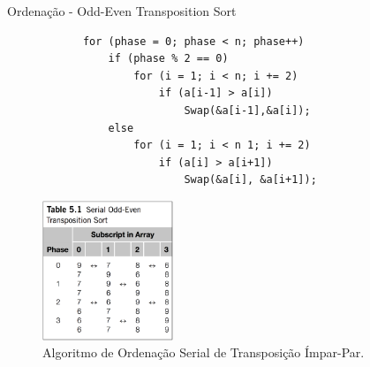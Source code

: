	\begin{frame}[fragile]{Ordenação - Odd-Even Transposition Sort }
		\begin{multicols}{2}
			\begin{verbatim}
			for (phase = 0; phase < n; phase++) 
				if (phase % 2 == 0)
					for (i = 1; i < n; i += 2)
						if (a[i-1] > a[i]) 
							Swap(&a[i-1],&a[i]); 
				else
					for (i = 1; i < n 1; i += 2)
						if (a[i] > a[i+1]) 
							Swap(&a[i], &a[i+1]);
			\end{verbatim}
		\columnbreak
			\begin{figure}[p]
				\centering
				\includegraphics[width=0.35\textwidth]{img/pacheco/odd-even.png}
				\caption{Algoritmo de Ordenação Serial de Transposição Ímpar-Par.}
			\end{figure}
		\end{multicols}
\end{frame}

